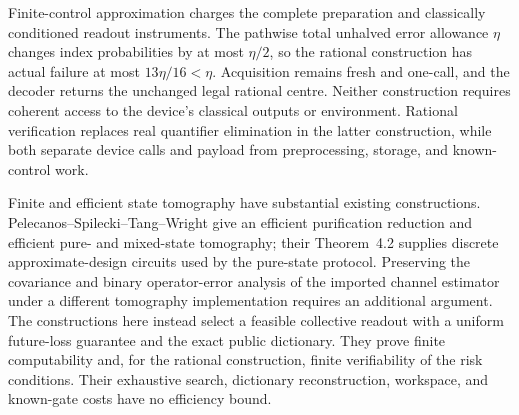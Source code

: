 Finite-control approximation charges the complete preparation and
classically conditioned readout instruments.  The pathwise total
unhalved error allowance $\eta$ changes index probabilities by at
most $\eta/2$, so the rational construction has actual failure at
most $13\eta/16<\eta$.  Acquisition remains fresh and one-call,
and the decoder returns the unchanged legal rational centre.
Neither construction requires coherent access to the device's
classical outputs or environment.  Rational verification replaces
real quantifier elimination in the latter construction, while both
separate device calls and payload from preprocessing, storage, and
known-control work.

Finite and efficient state tomography have substantial existing
constructions.  Pelecanos--Spilecki--Tang--Wright
\cite[Theorems~1.1--1.3, Section~3.3 and Figures~8--9]{PSTW80}
give an efficient purification reduction and efficient pure- and
mixed-state tomography; their Theorem~4.2 supplies discrete
approximate-design circuits used by the pure-state protocol.
Preserving the covariance and binary operator-error analysis of the
imported channel estimator under a different tomography
implementation requires an additional argument.  The constructions
here instead select a feasible collective readout with a uniform
future-loss guarantee and the exact public dictionary.  They prove
finite computability and, for the rational construction, finite
verifiability of the risk conditions.  Their exhaustive search,
dictionary reconstruction, workspace, and known-gate costs have no
efficiency bound.

